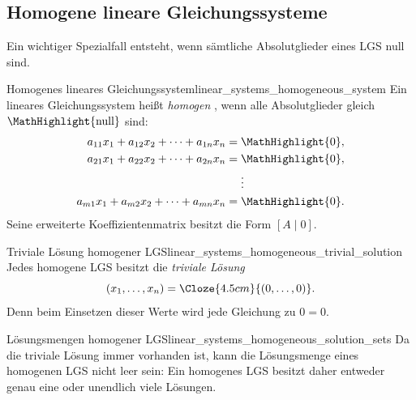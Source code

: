 \subsection{Homogene lineare Gleichungssysteme}
\label{subsec:linear_systems_homogeneous_systems}

Ein wichtiger Spezialfall entsteht, wenn sämtliche Absolutglieder eines LGS
null sind.

\begin{DefinitionBox}{Homogenes lineares Gleichungssystem}{linear_systems_homogeneous_system}
  Ein lineares Gleichungssystem heißt \emph{homogen}
  , wenn alle Absolutglieder gleich $\MathHighlight{\text{null}}$ sind:
  \[
    \begin{aligned}
      a_{11}x_1+a_{12}x_2+\dots+a_{1n}x_n&=\MathHighlight{0},\\
      a_{21}x_1+a_{22}x_2+\dots+a_{2n}x_n&=\MathHighlight{0},\\
      &\mathrel{\phantom{=}}\vdots\\
      a_{m1}x_1+a_{m2}x_2+\dots+a_{mn}x_n&=\MathHighlight{0}.
    \end{aligned}
  \]
  Seine erweiterte Koeffizientenmatrix besitzt die Form $[A\mid 0]$.
\end{DefinitionBox}

\begin{TheoremBox}{Triviale Lösung homogener LGS}{linear_systems_homogeneous_trivial_solution}
  Jedes homogene LGS besitzt die \emph{triviale Lösung}
  \[
    (x_1,\dots,x_n)=\Cloze{4.5cm}{(0,\dots,0)}.
  \]
  Denn beim Einsetzen dieser Werte wird jede Gleichung zu $0=0$.
\end{TheoremBox}

\begin{KeyPointBox}{Lösungsmengen homogener LGS}{linear_systems_homogeneous_solution_sets}
  Da die triviale Lösung immer vorhanden ist, kann die Lösungsmenge eines
  homogenen LGS nicht leer sein:
  \SolutionTypeCases*
  Ein homogenes LGS besitzt daher entweder genau eine oder unendlich viele
  Lösungen.
\end{KeyPointBox}
